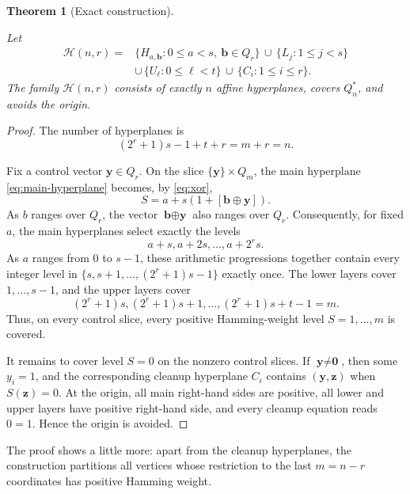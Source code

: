 \documentclass[11pt]{article}
\newtheorem{theorem}{Theorem}[section]
\newcommand{\Q}{Q}
\newcommand{\1}{\mathbf{1}}
\begin{document}
	
	
	
	\begin{theorem}[Exact construction]\label{thm:exact-construction}
		
		
		Let
		\begin{align*}
			\mathcal H(n,r)
			={}&\{H_{a,\textbf{b}}:0\le a<s,\ \textbf{b}\in\Q_r\}
			\,\cup\,\{L_j:1\le j<s\}\\
			&\cup\,\{U_\ell:0\le\ell<t\}
			\,\cup\,\{C_i:1\le i\le r\}.
		\end{align*}
		The family $\mathcal H(n,r)$ consists of exactly $n$ affine hyperplanes, covers $\Q_n^*$, and avoids the origin.
	\end{theorem}
	
	\begin{proof}
		The number of hyperplanes is
		\[
		(2^r+1)s-1+t+r=m+r=n.
		\]
		
		Fix a control vector $\textbf{y}\in\Q_r$. On the slice $\{\textbf{y}\}\times\Q_m$, the main hyperplane \eqref{eq:main-hyperplane} becomes, by \eqref{eq:xor},
		\begin{equation}\label{eq:selected-level}
			S=a+s(1+[\textbf{b}\oplus \textbf{y}]).
		\end{equation}
		As $b$ ranges over $\Q_r$, the vector $\textbf{b}\oplus \textbf{y}$ also ranges over $\Q_r$. Consequently, for fixed $a$, the main hyperplanes select exactly the levels
		\[
		a+s,a+2s,\dots,a+2^rs.
		\]
		As \(a\) ranges from \(0\) to \(s-1\), these arithmetic progressions
		together contain every integer level in
		\(\{s,s+1,\ldots,(2^r+1)s-1\}\) exactly once. The lower layers cover $1,\dots,s-1$, and the upper layers cover
		\[
		(2^r+1)s,(2^r+1)s+1,\dots,(2^r+1)s+t-1=m.
		\]
		Thus, on every control slice, every positive Hamming-weight level $S=1,\dots,m$ is covered.
		
		It remains to cover level $S=0$ on the nonzero control slices. If $\textbf{y}\ne \textbf{0}$, then some $y_i=1$, and the corresponding cleanup hyperplane $C_i$ contains $(\textbf{y},\textbf{z})$ when $S(\textbf{z})=0$. At the origin, all main right-hand sides are positive, all lower and upper layers have positive right-hand side, and every cleanup equation reads $0=1$. Hence the origin is avoided.
	\end{proof}
	
	The proof shows a little more: apart from the cleanup hyperplanes, the construction partitions all vertices whose restriction to the last $m=n-r$ coordinates has positive Hamming weight.
	
\end{document}
